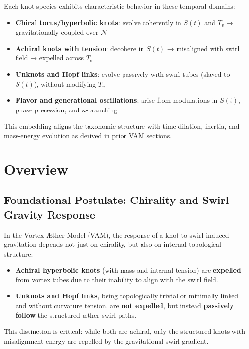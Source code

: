 Each knot species exhibits characteristic behavior in these temporal domains:

\begin{itemize}
    \item \textbf{Chiral torus/hyperbolic knots}: evolve coherently in $S(t)$ and $T_v$ → gravitationally coupled over $\mathcal{N}$
    \item \textbf{Achiral knots with tension}: decohere in $S(t)$ → misaligned with swirl field → expelled across $T_v$
    \item \textbf{Unknots and Hopf links}: evolve passively with swirl tubes (slaved to $S(t)$), without modifying $T_v$
    \item \textbf{Flavor and generational oscillations}: arise from modulations in $S(t)$, phase precession, and $\kappa$-branching
\end{itemize}

This embedding aligns the taxonomic structure with time-dilation, inertia, and mass-energy evolution as derived in prior VAM sections.




\section*{Overview}

\subsection*{Foundational Postulate: Chirality and Swirl Gravity Response}
In the Vortex Æther Model (VAM), the response of a knot to swirl-induced gravitation depends not just on chirality, but also on internal topological structure:

\begin{itemize}
    \item \textbf{Achiral hyperbolic knots} (with mass and internal tension) are \textbf{expelled} from vortex tubes due to their inability to align with the swirl field.
    \item \textbf{Unknots and Hopf links}, being topologically trivial or minimally linked and without curvature tension, are \textbf{not expelled}, but instead \textbf{passively follow} the structured æther swirl paths.
\end{itemize}

This distinction is critical: while both are achiral, only the structured knots with misalignment energy are repelled by the gravitational swirl gradient.

